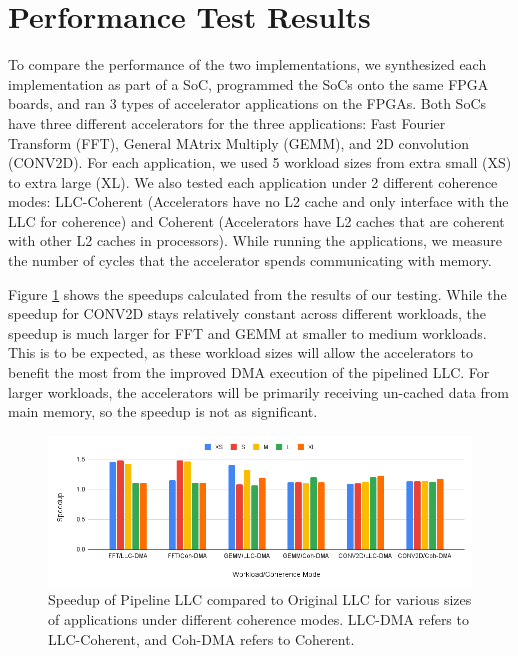\section{Performance Test Results}
\label{sec:performanceTestResults}
To compare the performance of the two implementations, 
we synthesized each implementation as part of a SoC, programmed the SoCs 
onto the same FPGA boards, and ran 3 types of accelerator applications on the FPGAs. 
Both SoCs have three different accelerators for the three applications: 
Fast Fourier Transform (FFT), General MAtrix Multiply (GEMM), and 2D convolution (CONV2D). 
For each application, we used 5 workload sizes from extra small (XS) to extra large (XL). 
We also tested each application under 2 different coherence modes: LLC-Coherent (Accelerators 
have no L2 cache and only interface with the LLC for coherence) and Coherent (Accelerators 
have L2 caches that are coherent with other L2 caches in processors). While running the applications, 
we measure the number of cycles that the accelerator spends communicating with memory.

\par Figure \ref{fig:dma_chart} shows the speedups calculated from the results of our testing. 
While the speedup for CONV2D stays relatively constant across different workloads, 
the speedup is much larger for FFT and GEMM at smaller to medium workloads. This is 
to be expected, as these workload sizes will allow the accelerators to benefit the most from the improved 
DMA execution of the pipelined LLC. For larger workloads, the accelerators will be primarily receiving 
un-cached data from main memory, so the speedup is not as significant. 


\begin{figure}[t]
    \centering
    \captionsetup{justification=centering, format=hang}
    \includegraphics[width=1\textwidth]{fig/DMA_chart.png}
    \caption{Speedup of Pipeline LLC compared to Original LLC for various sizes of applications under different coherence modes. LLC-DMA refers to LLC-Coherent, and Coh-DMA refers to Coherent.}
    \label{fig:dma_chart}
    \end{figure}
  